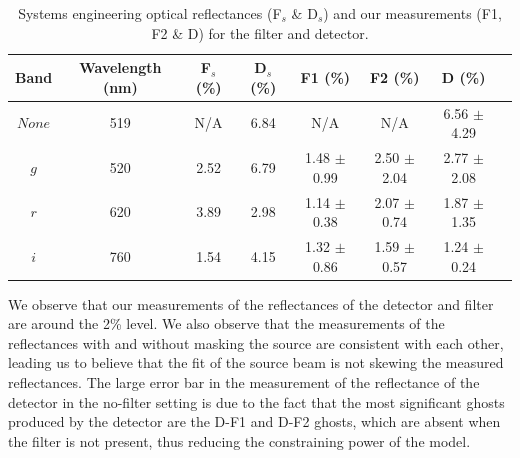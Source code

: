 \begin{table}[t!]
\centering
\begin{tabular}{cccccccc}
\hline
Band & Wavelength (nm) & F$_s$ (\%) & D$_s$ (\%) & F1 (\%) & F2 (\%) & D (\%) \\
\hline
$None$ & 519 & N/A & 6.84 & N/A & N/A & 6.56 $\pm$ 4.29 \\
$g$ & 520 & 2.52 & 6.79 & 1.48 $\pm$ 0.99 & 2.50 $\pm$ 2.04 & 2.77 $\pm$ 2.08\\
$r$ & 620 & 3.89 & 2.98 & 1.14 $\pm$ 0.38 & 2.07 $\pm$ 0.74 & 1.87 $\pm$ 1.35\\
$i$ & 760 & 1.54 & 4.15 & 1.32 $\pm$ 0.86 & 1.59 $\pm$ 0.57 & 1.24 $\pm$ 0.24\\
\hline
\end{tabular}
\caption{Systems engineering optical reflectances (F$_s$ \& D$_s$) and our measurements (F1, F2 \& D) for the filter and detector.}
\label{tab:syseng_throughputs}
\end{table}

 We observe that our measurements of the reflectances of the detector and filter are around the 2\% level.
 We also observe that the measurements of the reflectances with and without masking the source are consistent with each other, leading us to believe that the fit of the source beam is not skewing the measured reflectances.
 The large error bar in the measurement of the reflectance of the detector in the no-filter setting is due to the fact that the most significant ghosts produced by the detector are the D-F1 and D-F2 ghosts, which are absent when the filter is not present, thus reducing the constraining power of the model.